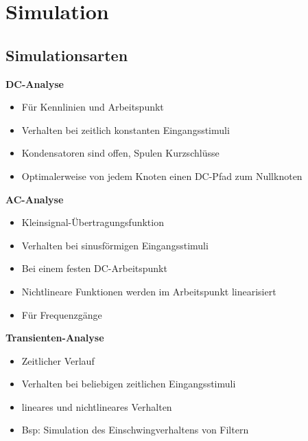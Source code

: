 \section{Simulation}
	\subsection{Simulationsarten}
	\begin{multicols}{2}
			{\bf DC-Analyse}
			\begin{itemize}
				\item Für Kennlinien und Arbeitspunkt
				\item Verhalten bei zeitlich konstanten Eingangsstimuli
				\item Kondensatoren sind offen, Spulen Kurzschlüsse
				\item Optimalerweise von jedem Knoten einen DC-Pfad zum Nullknoten
			\end{itemize}
			{\bf AC-Analyse}
			\begin{itemize}
				\item Kleinsignal-Übertragungsfunktion
				\item Verhalten bei sinusförmigen Eingangsstimuli
				\item Bei einem festen DC-Arbeitspunkt
				\item Nichtlineare Funktionen werden im Arbeitspunkt linearisiert
				\item Für Frequenzgänge
			\end{itemize}
	\columnbreak
			{\bf Transienten-Analyse}
			\begin{itemize}
				\item Zeitlicher Verlauf
				\item Verhalten bei beliebigen zeitlichen Eingangsstimuli
				\item lineares und nichtlineares Verhalten
				\item Bsp: Simulation des Einschwingverhaltens von Filtern
			\end{itemize}
	\end{multicols}